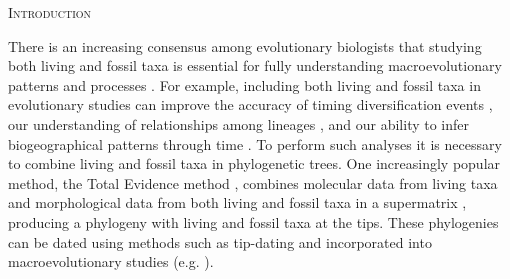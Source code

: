 \documentclass[12pt,letterpaper]{article}
\renewcommand{\section}[1]{%
\bigskip
\begin{center}
\begin{Large}
\normalfont\scshape #1
\medskip
\end{Large}
\end{center}}
\begin{document}
%
%





%
%


\newpage 
\section{Introduction}
There is an increasing consensus among evolutionary biologists that studying both living and fossil taxa is essential for fully understanding macroevolutionary patterns and processes \citep{jacksonwhat2006,quentaldiversity2010,dietlconservation2011,slaterunifying2013,fritzdiversity2013,Wood01032013}.
For example, including both living and fossil taxa in evolutionary studies can improve the accuracy of timing diversification events \citep[e.g.][]{ronquista2012}, our understanding of relationships among lineages \citep[e.g.][]{beckancient2014}, and our ability to infer biogeographical patterns through time \citep[e.g.][]{Meseguer01032015}.
To perform such analyses it is necessary to combine living and fossil taxa in phylogenetic trees.
One increasingly popular method, the Total Evidence method \citep{eernissetaxonomic1993,ronquista2012}, combines molecular data from living taxa and morphological data from both living and fossil taxa in a supermatrix \citep[e.g.][]{pyrondivergence2011,ronquista2012,schragocombining2013,slaterunifying2013,beckancient2014,Meseguer01032015}, producing a phylogeny with living and fossil taxa at the tips. 
These phylogenies can be dated using methods such as tip-dating \citep{ronquista2012,Drummond01082012,Wood01032013,BEASTmaster} and incorporated into macroevolutionary studies (e.g. ).
\end{document}
